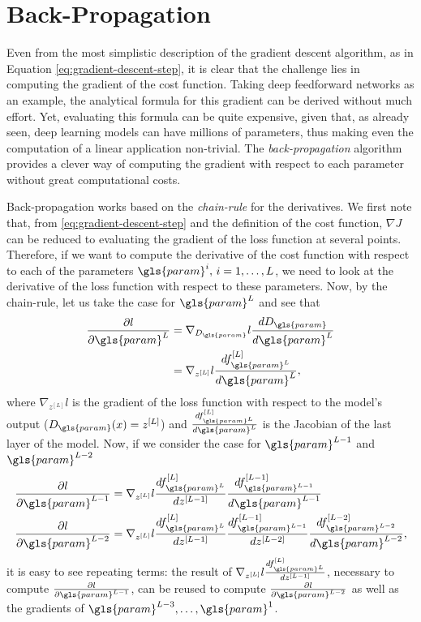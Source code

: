 \section{Back-Propagation}\label{sec:backprop}

Even from the most simplistic description of the gradient descent algorithm, as in Equation \eqref{eq:gradient-descent-step}, it is clear that the challenge lies in computing the gradient of the cost function.
Taking deep feedforward networks as an example, the analytical formula for this gradient can be derived without much effort.
Yet, evaluating this formula can be quite expensive, given that, as already seen, deep learning models can have millions of parameters, thus making even the computation of a linear application non-trivial.
The \emph{back-propagation} algorithm \cite{rumelhart_learning_1986} provides a clever way of computing the gradient with respect to each parameter without great computational costs.

Back-propagation works based on the \emph{chain-rule} for the derivatives.
We first note that, from \eqref{eq:gradient-descent-step} and the definition of the cost function, $\nabla J$ can be reduced to evaluating the gradient of the loss function at several points.
Therefore, if we want to compute the derivative of the cost function with respect to each of the parameters $\gls{param}^i,\,i=1,\ldots,L$, we need to look at the derivative of the loss function with respect to these parameters.
Now, by the chain-rule, let us take the case for $\gls{param}^L$ and see that
 \begin{align*}
     \frac{\partial l}{\partial\gls{param}^L} &= \nabla_{D_{\gls{param}}} l \frac{d D_{\gls{param}}}{d \gls{param}^L} \\
     &= \nabla_{z^{[L]}} l \frac{d f^{[L]}_{\gls{param}^L}}{d \gls{param}^L}
,\end{align*}
where $\nabla_{z^{[L]}} l$ is the gradient of the loss function with respect to the model's output ($D_{\gls{param}}(x)=z^{[L]}$) and $\frac{d f^{[L]}_{\gls{param}^L}}{d \gls{param}^L}$ is the Jacobian of the last layer of the model. Now, if we consider the case for $\gls{param}^{L-1}$ and $\gls{param}^{L-2}$
 \begin{align*}
     \frac{\partial l}{\partial\gls{param}^{L-1}} &= \nabla_{z^{[L]}} l \frac{d f^{[L]}_{\gls{param}^L}}{d z^{[L-1]}} \frac{d f^{[L-1]}_{\gls{param}^{L-1}}}{d \gls{param}^{L-1}} \\
     \frac{\partial l}{\partial\gls{param}^{L-2}} &= \nabla_{z^{[L]}} l \frac{d f^{[L]}_{\gls{param}^L}}{d z^{[L-1]}} \frac{d f^{[L-1]}_{\gls{param}^{L-1}}}{d z^{[L-2]}} \frac{d f^{[L-2]}_{\gls{param}^{L-2}}}{d \gls{param}^{L-2}}
,\end{align*}
it is easy to see repeating terms: the result of $\nabla_{z^{[L]}} l \frac{d f^{[L]}_{\gls{param}^L}}{d z^{[L-1]}}$, necessary to compute $\frac{\partial l}{\partial\gls{param}^{L-1}}$, can be reused to compute $\frac{\partial l}{\partial\gls{param}^{L-2}}$ as well as the gradients of $\gls{param}^{L-3},\ldots,\gls{param}^1$.

